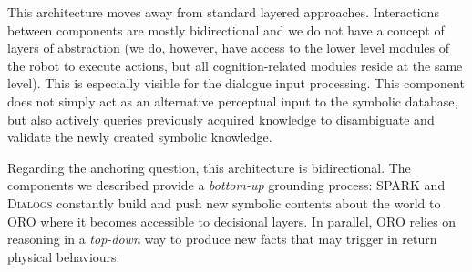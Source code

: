 \documentclass{svmult}
\begin{document}
This architecture moves away from standard layered approaches. Interactions
between components are mostly bidirectional and we do not have a concept of
layers of abstraction (we do, however, have access to the lower level modules
of the robot to execute actions, but all cognition-related modules reside at the
same level). This is especially visible for the dialogue input processing. This
component does not simply act as an alternative perceptual input to the
symbolic database, but also actively queries previously acquired knowledge to
disambiguate and validate the newly created symbolic knowledge.


Regarding the anchoring question, this architecture is
bidirectional. The components we described provide a \textit{bottom-up}
grounding process: SPARK and \textsc{Dialogs} constantly build and push new
symbolic contents about the world to ORO where it becomes accessible to
decisional layers. In parallel, ORO relies on reasoning in a \textit{top-down}
way to produce new facts that may trigger in return physical behaviours. 



\end{document}
